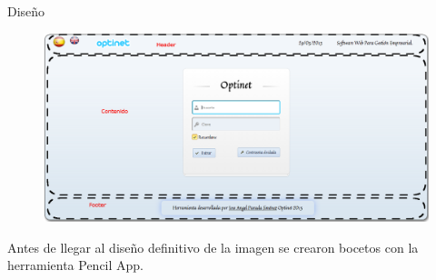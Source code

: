 \documentclass[spanish,xcolor=table,svgnames]{beamer}
\begin{document}
\begin{frame}{Diseño}
  \begin{figure}[]
\includegraphics[scale=0.2]{diseno}
\end{figure}
  \begin{block}{}
 Antes de llegar al diseño definitivo de la imagen se crearon bocetos con la herramienta Pencil App. 
  \end{block}
\end{frame}
\end{document}
